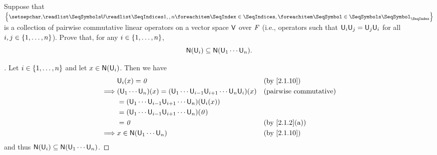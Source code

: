 \begin{ex}\label{ex:2.7.9}
  Suppose that \(\set{\seq{\U}{1,,n}}\) is a collection of pairwise commutative linear operators on a vector space \(\mathsf{V}\) over \(\mathit{F}\)
  (i.e., operators such that \(\mathsf{U}_i \mathsf{U}_j = \mathsf{U}_j \mathsf{U}_i\) for all \(i, j \in \left\lbrace1, \dots, n\right\rbrace\)).
  Prove that, for any \(i \in \left\lbrace1, \dots, n\right\rbrace\),
  \[
    \ns{\U_i} \subseteq \ns{\U_1 \cdots \U_n}.
  \]
\end{ex}

\begin{proof}[]
  Let \(i \in \left\lbrace1, \dots, n\right\rbrace\) and let \(x \in \ns{\U_i}\).
  Then we have
  \begin{align*}
             & \U_i(x) = \zv                                                                   &  & \text{(by \cref{2.1.10})}     \\
    \implies & (\U_1 \cdots \U_n)(x) = (\U_1 \cdots \U_{i - 1} \U_{i + 1} \cdots \U_n \U_i)(x) &  & \text{(pairwise commutative)} \\
             & = (\U_1 \cdots \U_{i - 1} \U_{i + 1} \cdots \U_n)(\U_i(x))                                                         \\
             & = (\U_1 \cdots \U_{i - 1} \U_{i + 1} \cdots \U_n)(\zv)                                                             \\
             & = \zv                                                                           &  & \text{(by \cref{2.1.2}(a))}   \\
    \implies & x \in \ns{\U_1 \cdots \U_n}                                                     &  & \text{(by \cref{2.1.10})}
  \end{align*}
  and thus \(\ns{\U_i} \subseteq \ns{\U_1 \cdots \U_n}\).
\end{proof}
